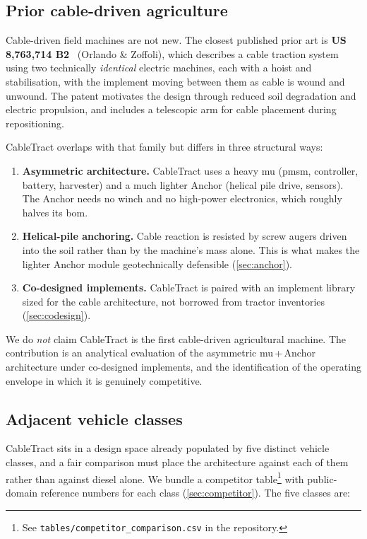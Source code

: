 \documentclass[11pt,a4paper]{article}
\begin{document}
\subsection{Prior cable-driven agriculture}\label{sec:related-cable}

Cable-driven field machines are not new. The closest published prior art is \textbf{US 8,763,714 B2}~\cite{orlando2014patent} (Orlando \& Zoffoli), which describes a cable traction system using two technically \emph{identical} electric machines, each with a hoist and stabilisation, with the implement moving between them as cable is wound and unwound. The patent motivates the design through reduced soil degradation and electric propulsion, and includes a telescopic arm for cable placement during repositioning.

CableTract overlaps with that family but differs in three structural ways:

\begin{enumerate}[leftmargin=1.6em,itemsep=0.2em]
    \item \textbf{Asymmetric architecture.} CableTract uses a heavy \gls{mu} (\gls{pmsm}, controller, battery, harvester) and a much lighter Anchor (helical pile drive, sensors). The Anchor needs no winch and no high-power electronics, which roughly halves its \gls{bom}.
    \item \textbf{Helical-pile anchoring.} Cable reaction is resisted by screw augers driven into the soil rather than by the machine's mass alone. This is what makes the lighter Anchor module geotechnically defensible (\cref{sec:anchor}).
    \item \textbf{Co-designed implements.} CableTract is paired with an implement library sized for the cable architecture, not borrowed from tractor inventories (\cref{sec:codesign}).
\end{enumerate}

We do \emph{not} claim CableTract is the first cable-driven agricultural machine. The contribution is an analytical evaluation of the asymmetric \gls{mu}\,+\,Anchor architecture under co-designed implements, and the identification of the operating envelope in which it is genuinely competitive.

\subsection{Adjacent vehicle classes}\label{sec:related-adjacent}

CableTract sits in a design space already populated by five distinct vehicle classes, and a fair comparison must place the architecture against each of them rather than against diesel alone. We bundle a competitor table\footnote{See \texttt{tables/competitor\_comparison.csv} in the repository.} with public-domain reference numbers for each class (\cref{sec:competitor}). The five classes are:
\end{document}

